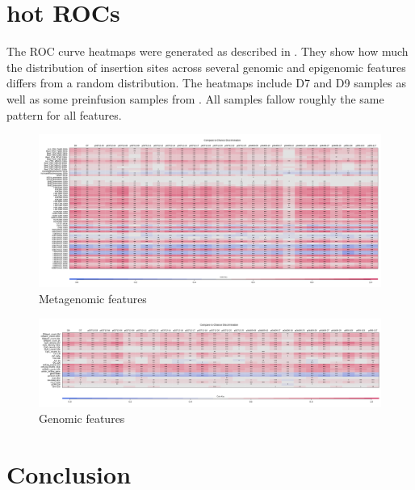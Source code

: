 \documentclass[]{article}
\begin{document}
\hypertarget{hot-rocs}{%
\section{hot ROCs}\label{hot-rocs}}

The ROC curve heatmaps were generated as described in \citet{berry2006}.
They show how much the distribution of insertion sites across several
genomic and epigenomic features differs from a random distribution. The
heatmaps include D7 and D9 samples as well as some preinfusion samples
from \citet{nobles2020}. All samples fallow roughly the same pattern for
all features.

\begin{figure}[H]

{\centering \includegraphics[width=1\linewidth]{epiGenHeatMap_ddd/main} 

}

\caption{Metagenomic features}\label{fig:unnamed-chunk-2}
\end{figure}

\begin{figure}[H]

{\centering \includegraphics[width=1\linewidth]{genHeatMap_ddd/main} 

}

\caption{Genomic features}\label{fig:unnamed-chunk-3}
\end{figure}

\hypertarget{conclusion}{%
\section{Conclusion}\label{conclusion}}
\end{document}
